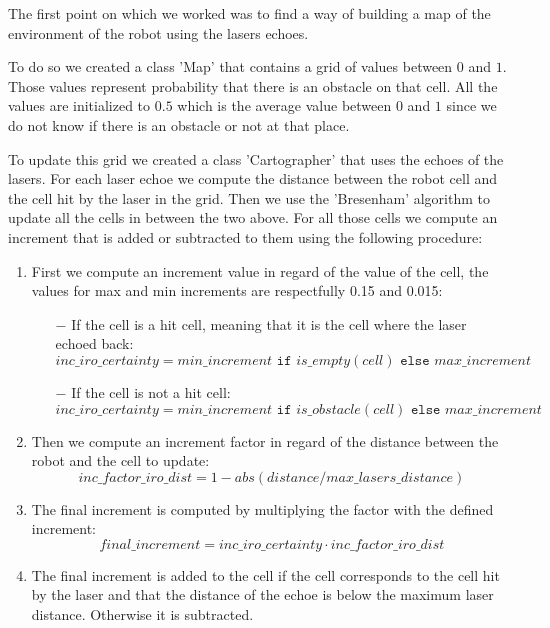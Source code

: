 The first point on which we worked was to find a way of building a map of the environment of the robot using the lasers echoes.

To do so we created a class 'Map' that contains a grid of values between $0$ and $1$.
Those values represent probability that there is an obstacle on that cell.
All the values are initialized to $0.5$ which is the average value between $0$ and $1$ since we do not know if there is an obstacle or not at that place.

To update this grid we created a class 'Cartographer' that uses the echoes of the lasers.
For each laser echoe we compute the distance between the robot cell and the cell hit by the laser in the grid.
Then we use the 'Bresenham' algorithm to update all the cells in between the two above.
For all those cells we compute an increment that is added or subtracted to them using the following procedure:

\begin{enumerate}
    \item First we compute an increment value in regard of the value of the cell, the values for max and min increments are respectfully 0.15 and 0.015:
        \begin{itemize}
            \item[$-$] If the cell is a hit cell, meaning that it is the cell where the laser echoed back:
            $$
                inc\_iro\_certainty = min\_increment\texttt{ if }is\_empty(cell)\texttt{ else }max\_increment
            $$
            \item[$-$] If the cell is not a hit cell:
            $$
                inc\_iro\_certainty = min\_increment\texttt{ if }is\_obstacle(cell)\texttt{ else }max\_increment
            $$
        \end{itemize}
    \item Then we compute an increment factor in regard of the distance between the robot and the cell to update:
        $$
        inc\_factor\_iro\_dist = 1 - abs(distance / max\_lasers\_distance)
        $$
    \item The final increment is computed by multiplying the factor with the defined increment:
        $$
        final\_increment = inc\_iro\_certainty \cdot inc\_factor\_iro\_dist
        $$
    \item The final increment is added to the cell if the cell corresponds to the cell hit by the laser and that the distance of the echoe is below the maximum laser distance.
        Otherwise it is subtracted.
\end{enumerate}

